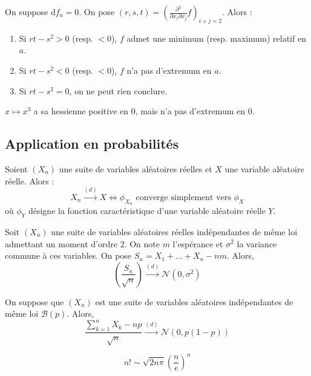 	\begin{example}
		On suppose $\mathrm{d}f_a = 0$. On pose $(r,s,t) = \left(  \frac{\partial^2}{\partial x_i \partial x_j} f \right)_{i+j=2}$. Alors :
		\begin{enumerate}[label=(\roman*)]
			\item Si $rt-s^2 > 0$ (resp. $< 0$), $f$ admet une minimum (resp. maximum) relatif en $a$.
			\item Si $rt-s^2 < 0$ (resp. $< 0$), $f$ n'a pas d'extremum en $a$.
			\item Si $rt-s^2 = 0$, on ne peut rien conclure.
		\end{enumerate}
	\end{example}
	
	\begin{cexample}
		$x \mapsto x^3$ a sa hessienne positive en $0$, mais n'a pas d'extremum en $0$.
	\end{cexample}
	
	\subsection{Application en probabilités}
	
	
	\begin{theorem}[Lévy]
		Soient $(X_n)$ une suite de variables aléatoires réelles et $X$ une variable aléatoire réelle. Alors :
		\[ X_n \overset{(d)}{\longrightarrow} X \iff \phi_{X_n} \text{ converge simplement vers } \phi_X \]
		où $\phi_Y$ désigne la fonction caractéristique d'une variable aléatoire réelle $Y$.
	\end{theorem}
	
	
	\begin{theorem}
		Soit $(X_n)$ une suite de variables aléatoires réelles indépendantes de même loi admettant un moment d'ordre $2$. On note $m$ l'espérance et $\sigma^2$ la variance commune à ces variables. On pose $S_n = X_1 + \dots + X_n - nm$. Alors,
		\[ \left ( \frac{S_n}{\sqrt{n}} \right) \overset{(d)}{\longrightarrow} \mathcal{N}(0, \sigma^2) \]
	\end{theorem}
	
	\begin{application}
		On suppose que $(X_n)$ est une suite de variables aléatoires indépendantes de même loi $\mathcal{B}(p)$. Alors,
		\[ \frac{\sum_{k=1}^{n} X_k - np}{\sqrt{n}} \overset{(d)}{\longrightarrow} \mathcal{N}(0, p(1-p)) \]
	\end{application}
	
	
	\begin{application}
		\[ n! \sim \sqrt{2n\pi} \left(\frac{n}{e} \right)^n \]
	\end{application}

